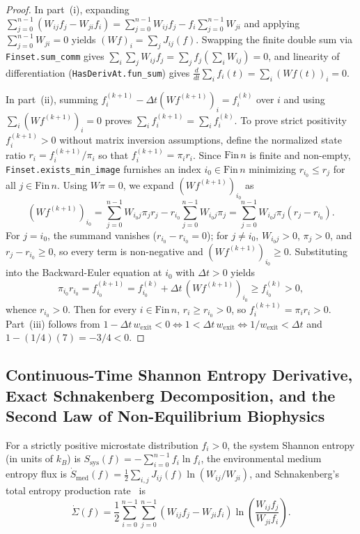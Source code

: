 \documentclass[11pt,a4paper]{article}
\theoremstyle{definition}
\begin{document}
\begin{proof}
In part~(i), expanding $\sum_{j=0}^{n-1}(W_{ij}f_j - W_{ji}f_i) = \sum_{j=0}^{n-1} W_{ij}f_j - f_i\sum_{j=0}^{n-1} W_{ji}$ and applying $\sum_{j=0}^{n-1} W_{ji} = 0$ yields $(Wf)_i = \sum_j J_{ij}(f)$. Swapping the finite double sum via \texttt{Finset.sum\_comm} gives $\sum_i \sum_j W_{ij}f_j = \sum_j f_j \left(\sum_i W_{ij}\right) = 0$, and linearity of differentiation (\texttt{HasDerivAt.fun\_sum}) gives $\frac{d}{dt}\sum_i f_i(t) = \sum_i (Wf(t))_i = 0$.

In part~(ii), summing $f_i^{(k+1)} - \Delta t(Wf^{(k+1)})_i = f_i^{(k)}$ over $i$ and using $\sum_i (Wf^{(k+1)})_i = 0$ proves $\sum_i f_i^{(k+1)} = \sum_i f_i^{(k)}$. To prove strict positivity $f_i^{(k+1)} > 0$ without matrix inversion assumptions, define the normalized state ratio $r_i = f_i^{(k+1)}/\pi_i$ so that $f_i^{(k+1)} = \pi_i r_i$. Since $\mathrm{Fin}\,n$ is finite and non-empty, \texttt{Finset.exists\_min\_image} furnishes an index $i_0 \in \mathrm{Fin}\,n$ minimizing $r_{i_0} \le r_j$ for all $j \in \mathrm{Fin}\,n$. Using $W\pi = 0$, we expand $(W f^{(k+1)})_{i_0}$ as
\[
  (W f^{(k+1)})_{i_0} = \sum_{j=0}^{n-1} W_{i_0 j}\pi_j r_j - r_{i_0}\sum_{j=0}^{n-1} W_{i_0 j}\pi_j = \sum_{j=0}^{n-1} W_{i_0 j}\pi_j (r_j - r_{i_0}).
\]
For $j = i_0$, the summand vanishes ($r_{i_0} - r_{i_0} = 0$); for $j \ne i_0$, $W_{i_0 j} > 0$, $\pi_j > 0$, and $r_j - r_{i_0} \ge 0$, so every term is non-negative and $(Wf^{(k+1)})_{i_0} \ge 0$. Substituting into the Backward-Euler equation at $i_0$ with $\Delta t > 0$ yields
\[
  \pi_{i_0} r_{i_0} = f_{i_0}^{(k+1)} = f_{i_0}^{(k)} + \Delta t\,(W f^{(k+1)})_{i_0} \ge f_{i_0}^{(k)} > 0,
\]
whence $r_{i_0} > 0$. Then for every $i \in \mathrm{Fin}\,n$, $r_i \ge r_{i_0} > 0$, so $f_i^{(k+1)} = \pi_i r_i > 0$. Part~(iii) follows from $1 - \Delta t\,w_{\mathrm{exit}} < 0 \iff 1 < \Delta t\,w_{\mathrm{exit}} \iff 1/w_{\mathrm{exit}} < \Delta t$ and $1 - (1/4)(7) = -3/4 < 0$.
\end{proof}

\subsection{Continuous-Time Shannon Entropy Derivative, Exact Schnakenberg Decomposition, and the Second Law of Non-Equilibrium Biophysics}

For a strictly positive microstate distribution $f_i > 0$, the system Shannon entropy (in units of $k_B$) is $S_{\mathrm{sys}}(f) = -\sum_{i=0}^{n-1} f_i \ln f_i$, the environmental medium entropy flux is $\dot{S}_{\mathrm{med}}(f) = \frac{1}{2}\sum_{i,j} J_{ij}(f)\ln(W_{ij}/W_{ji})$, and Schnakenberg's total entropy production rate~\cite{Schnakenberg1976} is
\begin{equation}
  \dot{\Sigma}(f) = \frac{1}{2}\sum_{i=0}^{n-1}\sum_{j=0}^{n-1} \left(W_{ij}f_j - W_{ji}f_i\right)\ln\!\left(\frac{W_{ij}f_j}{W_{ji}f_i}\right).
\end{equation}
\end{document}
